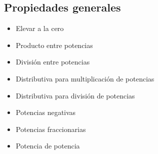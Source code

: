 \subsection*{Propiedades generales}

\begin{itemize}
\item
{}
Elevar a la cero

\item
{}
Producto entre potencias

\item
{}
División entre potencias

\item
{}
Distributiva para multiplicación de potencias

\item
{}
Distributiva para división de potencias

\item
{}
Potencias negativas

\item
{}
Potencias fraccionarias

\item
{}
Potencia de potencia
\end{itemize}
